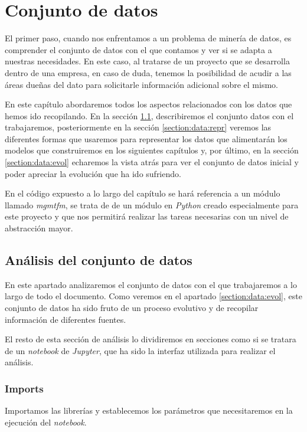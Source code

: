 \chapter{Conjunto de datos}
\label{chapter:dataset}
El primer paso, cuando nos enfrentamos a un problema de minería de datos, es comprender el conjunto de datos con el que contamos y ver si se adapta a nuestras necesidades. En este caso, al tratarse de un proyecto que se desarrolla dentro de una empresa, en caso de duda, tenemos la posibilidad de acudir a las áreas dueñas del dato para solicitarle información adicional sobre el mismo. 

En este capítulo abordaremos todos los aspectos relacionados con los datos que hemos ido recopilando. En la sección \ref{section:data:ana}, describiremos el conjunto datos con el trabajaremos, posteriormente en la sección \ref{section:data:repr} veremos las diferentes formas que usaremos para representar los datos que alimentarán los modelos que construiremos en los siguientes capítulos y, por último, en la sección \ref{section:data:evol} echaremos la vista atrás para ver el conjunto de datos inicial y poder apreciar la evolución que ha ido sufriendo.

En el código expuesto a lo largo del capítulo se hará referencia a un módulo llamado \textit{mgmtfm}, se trata de de un módulo en \textit{Python} creado especialmente para este proyecto y que nos permitirá realizar las tareas necesarias con un nivel de abstracción mayor. 

\section{Análisis del conjunto de datos}
\label{section:data:ana}
En este apartado analizaremos el conjunto de datos con el que trabajaremos a lo largo de todo el documento. Como veremos en el apartado \ref{section:data:evol}, este conjunto de datos ha sido fruto de un proceso evolutivo y de recopilar información de diferentes fuentes. 

El resto de esta sección de análisis lo dividiremos en secciones como si se tratara de un \textit{notebook} de \textit{Jupyter}, que ha sido la interfaz utilizada para realizar el análisis.


\subsection{Imports}

   Importamos las librerías y establecemos los parámetros que necesitaremos en la ejecución del \textit{notebook}.

